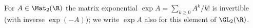 For $A\in\Mat_2(\R)$ the matrix exponential $\exp A=\sum_{k\ge0}A^k/k!$ is invertible (with inverse $\exp(-A)$); we write $\exp A$ also for this element of $\GL_2(\R)$.
